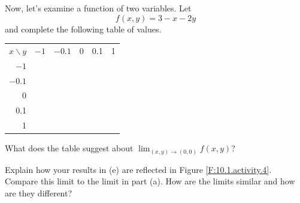 \begin{pa}
\item Now, let's examine a function of two variables.  Let  
  $$
  f(x,y) = 3 - x - 2y
  $$
  and complete the following table of values.

  \begin{center}
    \begin{tabular}{|r||c|c|c|c|c|}
      \hline
      $x\backslash y$ &$-1$ & $-0.1$ & 0 & 0.1 & 1 \\
      \hhline{|=|=|=|=|=|=|}
      $-1$ & \hspace*{0.5in} & \hspace*{0.5in} & \hspace*{0.5in}  & \hspace*{0.5in} & \hspace*{0.5in} \\
      \hline
      $-0.1$ & & & & & \\
      \hline
      0 & & & & & \\
      \hline
      0.1 & & & & & \\
      \hline
      1 & & & & & \\
      \hline
    \end{tabular}
  \end{center}
  What does the table suggest about $\lim_{(x,y)\to(0,0)} f(x,y)$?

\item Explain how your results in (e) are reflected in Figure
  \ref{F:10.1.activity.4}. Compare this limit to the limit in part (a). How are the limits similar and how are they different?


\end{pa}
